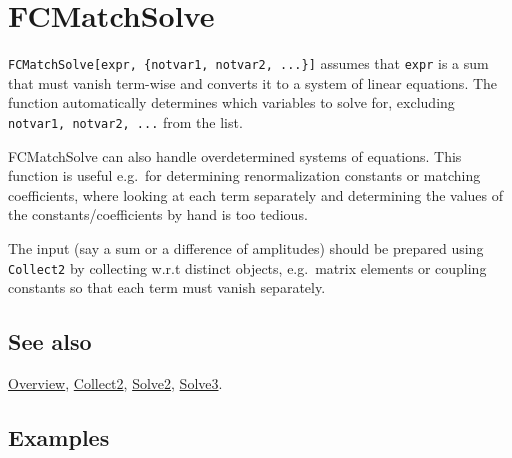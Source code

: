 \documentclass[../FeynCalcManual.tex]{subfiles}
\begin{document}
\hypertarget{fcmatchsolve}{%
\section{FCMatchSolve}\label{fcmatchsolve}}

\texttt{FCMatchSolve[\allowbreak{}expr,\ \allowbreak{}\{\allowbreak{}notvar1,\ \allowbreak{}notvar2,\ \allowbreak{}...\}]}
assumes that \texttt{expr} is a sum that must vanish term-wise and
converts it to a system of linear equations. The function automatically
determines which variables to solve for, excluding
\texttt{notvar1,\ \allowbreak{}notvar2,\ \allowbreak{}...} from the
list.

FCMatchSolve can also handle overdetermined systems of equations. This
function is useful e.g.~for determining renormalization constants or
matching coefficients, where looking at each term separately and
determining the values of the constants/coefficients by hand is too
tedious.

The input (say a sum or a difference of amplitudes) should be prepared
using \texttt{Collect2} by collecting w.r.t distinct objects,
e.g.~matrix elements or coupling constants so that each term must vanish
separately.

\subsection{See also}

\hyperlink{toc}{Overview}, \hyperlink{collect2}{Collect2},
\hyperlink{solve2}{Solve2}, \hyperlink{solve3}{Solve3}.

\subsection{Examples}
\end{document}
